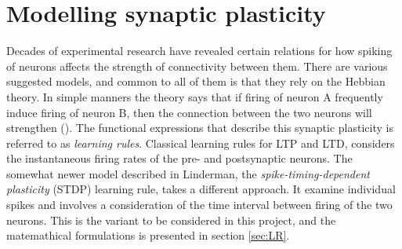 






\section{Modelling synaptic plasticity}
\label{sec:SP}

Decades of experimental research have revealed certain relations for how spiking of neurons affects the strength of connectivity between them. There are various suggested models, and common to all of them is that they rely on the Hebbian theory. In simple manners the theory says that if firing of neuron A frequently induce firing of neuron B, then the connection between the two neurons will strengthen (\cite{Hebb}). The functional expressions that describe this synaptic plasticity is referred to as \textit{learning rules}. Classical learning rules for LTP and LTD, considers the instantaneous firing rates of the pre- and postsynaptic neurons. The somewhat newer model described in Linderman, the \textit{spike-timing-dependent plasticity} (STDP) learning rule, takes a different approach. It examine individual spikes and involves a consideration of the time interval between firing of the two neurons. This is the variant to be considered in this project, and the matemathical formulations is presented in section \ref{sec:LR}.

